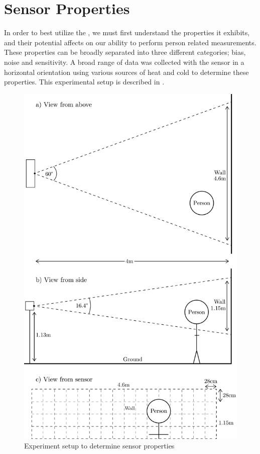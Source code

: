 \documentclass[../thesis/thesis.tex]{subfiles}
\begin{document}
\section{Sensor Properties}

In order to best utilize the \mlx, we must first understand the properties it exhibits, and their potential affects on our ability to perform person related measurements. These properties can be broadly separated into three different categories; bias, noise and sensitivity. A broad range of data was collected with the sensor in a horizontal orientation using various sources of heat and cold to determine these properties. This experimental setup is described in .

\begin{figure}
\centering
\includegraphics[height=0.9\textheight]{../diagrams/second-exp-setup2.pdf}
\caption{Experiment setup to determine sensor properties}
\label{fig:exps:2setup}
\end{figure}
\end{document}
